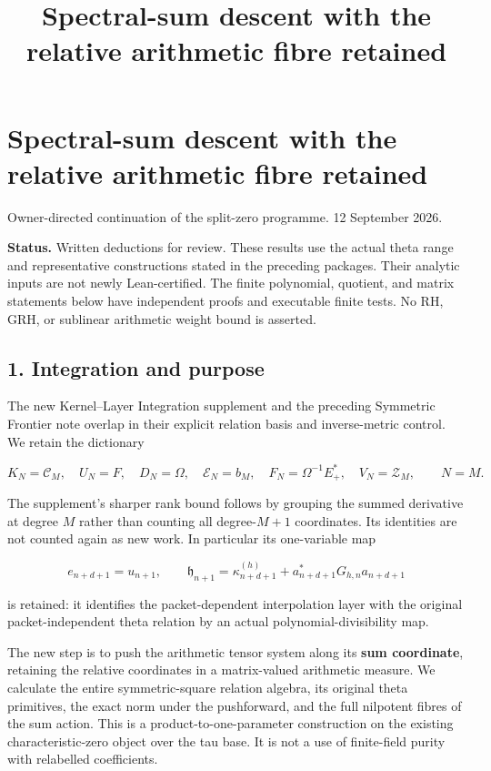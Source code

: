 \documentclass[
]{article}
\title{Spectral-sum descent with the relative arithmetic fibre retained}
\author{}
\date{}
\begin{document}
\maketitle

\section{Spectral-sum descent with the relative arithmetic fibre
retained}\label{spectral-sum-descent-with-the-relative-arithmetic-fibre-retained}

Owner-directed continuation of the split-zero programme. 12 September
2026.

\textbf{Status.} Written deductions for review. These results use the
actual theta range and representative constructions stated in the
preceding packages. Their analytic inputs are not newly Lean-certified.
The finite polynomial, quotient, and matrix statements below have
independent proofs and executable finite tests. No RH, GRH, or sublinear
arithmetic weight bound is asserted.

\subsection{1. Integration and purpose}\label{integration-and-purpose}

The new Kernel--Layer Integration supplement and the preceding Symmetric
Frontier note overlap in their explicit relation basis and
inverse-metric control. We retain the dictionary

\[K_N=\mathcal C_M,\quad U_N=F,\quad D_N=\Omega,\quad
\mathscr E_N=b_M,\quad F_N=\Omega^{-1}E_+^*,\quad V_N=\mathcal Z_M,\qquad N=M.\tag{1.1}\]

The supplement's sharper rank bound follows by grouping the summed
derivative at degree \(M\) rather than counting all degree-\(M+1\)
coordinates. Its identities are not counted again as new work. In
particular its one-variable map

\[e_{n+d+1}=u_{n+1},\qquad
\mathfrak h_{n+1}=\kappa_{n+d+1}^{(h)}+a_{n+d+1}^*G_{h,n}a_{n+d+1}\tag{1.2}\]

is retained: it identifies the packet-dependent interpolation layer with
the original packet-independent theta relation by an actual
polynomial-divisibility map.

The new step is to push the arithmetic tensor system along its
\textbf{sum coordinate}, retaining the relative coordinates in a
matrix-valued arithmetic measure. We calculate the entire
symmetric-square relation algebra, its original theta primitives, the
exact norm under the pushforward, and the full nilpotent fibres of the
sum action. This is a product-to-one-parameter construction on the
existing characteristic-zero object over the tau base. It is not a use
of finite-field purity with relabelled coefficients.
\end{document}
